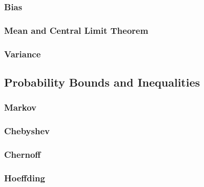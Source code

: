 \documentclass[twoside,twocolumn]{article}
\begin{document}
\subsubsection{Bias}
\subsubsection{Mean and Central Limit Theorem}
\subsubsection{Variance}
\subsection{Probability Bounds and Inequalities}
\subsubsection{Markov}
\subsubsection{Chebyshev}
\subsubsection{Chernoff}
\subsubsection{Hoeffding}
\end{document}

